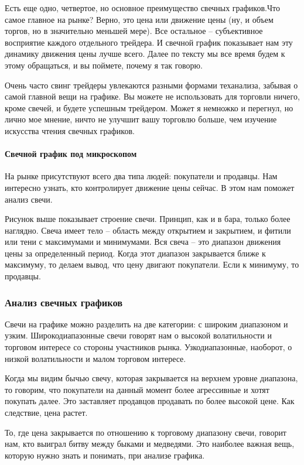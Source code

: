 \documentclass{book}
\begin{document}
Есть еще одно, четвертое, но основное преимущество свечных графиков.Что самое главное на рынке? Верно, это цена или движение цены (ну, и объем торгов, но в значительно меньшей мере). Все остальное – субъективное восприятие каждого отдельного трейдера. И свечной график показывает нам эту динамику движения цены лучше всего. Далее по тексту мы все время будем к этому обращаться, и вы поймете, почему я так говорю.

Очень часто свинг трейдеры увлекаются разными формами теханализа,
забывая о самой главной вещи на графике. Вы можете не использовать для
торговли ничего, кроме свечей, и будете успешным трейдером. Может я
немножко и перегнул, но лично мое мнение, ничто не улучшит вашу
торговлю больше, чем изучение искусства чтения свечных графиков.

\paragraph{Свечной график под микроскопом}

На рынке присутствуют всего два типа людей: покупатели и продавцы. Нам интересно узнать, кто контролирует движение цены сейчас. В этом нам поможет анализ свечи.

Рисунок выше показывает строение свечи. Принцип, как и в бара, только
более наглядно. Свеча имеет тело – область между открытием и
закрытием, и фитили или тени с максимумами и минимумами. Вся свеча –
это диапазон движения цены за определенный период. Когда этот диапазон
закрывается ближе к максимуму, то делаем вывод, что цену двигают
покупатели. Если к минимуму, то продавцы.

\subsubsection{Анализ свечных графиков}

Свечи на графике можно разделить на две категории: с широким диапазоном и узким. Широкодиапазонные свечи говорят нам о высокой волатильности и торговом интересе со стороны участников рынка. Узкодиапазонные, наоборот, о низкой волатильности и малом торговом интересе.

Когда мы видим бычью свечу, которая закрывается на верхнем уровне диапазона, то говорим, что покупатели на данный момент более агрессивные и хотят покупать далее. Это заставляет продавцов продавать по более высокой цене. Как следствие, цена растет.

То, где цена закрывается по отношению к торговому диапазону свечи, говорит нам, кто выиграл битву между быками и медведями. Это наиболее важная вещь, которую нужно знать и понимать, при анализе графика.
\end{document}
